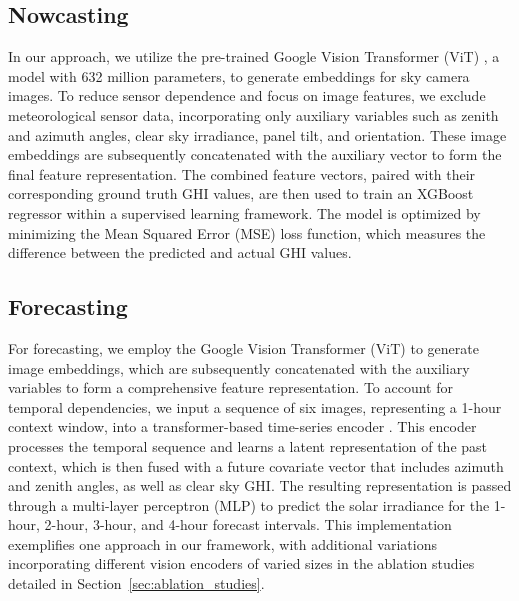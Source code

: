 \subsection{Nowcasting}

In our approach, we utilize the pre-trained Google Vision Transformer (ViT) \cite{google_vit}, a model with 632 million parameters, to generate embeddings for sky camera images. To reduce sensor dependence and focus on image features, we exclude meteorological sensor data, incorporating only auxiliary variables such as zenith and azimuth angles, clear sky irradiance, panel tilt, and orientation. These image embeddings are subsequently concatenated with the auxiliary vector to form the final feature representation. The combined feature vectors, paired with their corresponding ground truth GHI values, are then used to train an XGBoost regressor within a supervised learning framework. The model is optimized by minimizing the Mean Squared Error (MSE) loss function, which measures the difference between the predicted and actual GHI values.

\subsection{Forecasting}

For forecasting, we employ the Google Vision Transformer (ViT) \cite{google_vit} to generate image embeddings, which are subsequently concatenated with the auxiliary variables to form a comprehensive feature representation. To account for temporal dependencies, we input a sequence of six images, representing a 1-hour context window, into a transformer-based time-series encoder \cite{vaswani2017attention}. This encoder processes the temporal sequence and learns a latent representation of the past context, which is then fused with a future covariate vector that includes azimuth and zenith angles, as well as clear sky GHI. The resulting representation is passed through a multi-layer perceptron (MLP) to predict the solar irradiance for the 1-hour, 2-hour, 3-hour, and 4-hour forecast intervals. This implementation exemplifies one approach in our framework, with additional variations incorporating different vision encoders of varied sizes in the ablation studies detailed in Section~\ref{sec:ablation_studies}.

